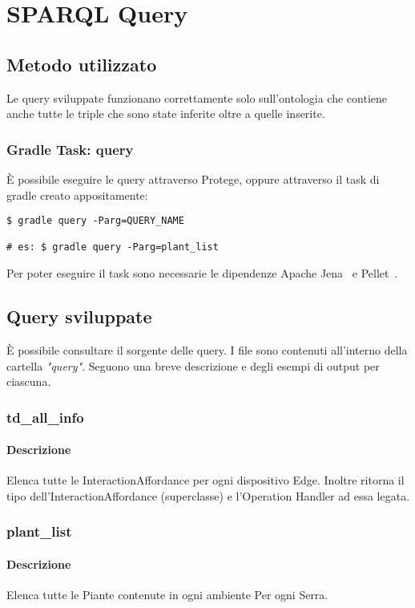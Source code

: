\section{SPARQL Query}
\subsection{Metodo utilizzato}
Le query sviluppate funzionano correttamente solo sull'ontologia che contiene anche tutte le triple che sono state inferite oltre a quelle inserite.

\subsubsection{Gradle Task: query}
\noindent È possibile eseguire le query attraverso Protege, oppure attraverso il task di gradle creato appositamente:

\begin{verbatim}
$ gradle query -Parg=QUERY_NAME

# es: $ gradle query -Parg=plant_list
\end{verbatim}

\noindent Per poter eseguire il task sono necessarie le dipendenze Apache Jena~\cite{ApacheJe75:online} e Pellet~\cite{AURenpel94:online}.
\subsection{Query sviluppate}
È possibile consultare il sorgente delle query. I file sono contenuti all'interno della cartella \textit{"query"}. Seguono una breve descrizione e degli esempi di output per ciascuna.
\subsubsection{td\_all\_info}
\paragraph{Descrizione}
Elenca tutte le InteractionAffordance per ogni dispositivo Edge. Inoltre ritorna il tipo dell'InteractionAffordance (superclasse) e l'Operation Handler ad essa legata.
\subsubsection{plant\_list}
\paragraph{Descrizione}
Elenca tutte le Piante contenute in ogni ambiente Per ogni Serra.

